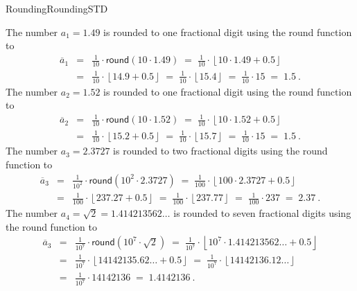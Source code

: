 \begin{MXContent}{Rounding}{Rounding}{STD}
\begin{MExample}
The number $a_{1}=1.49$ is rounded to one fractional digit using the \textsf{round} function to
\begin{eqnarray*}
\overline{a}_1 & = & \frac{1}{10}\cdot \mathsf{round}(10 \cdot 1.49) \; =\; \frac{1}{10}\cdot \left\lfloor{10\cdot 1.49 + 0.5}\right\rfloor\\
&=& \frac{1}{10}\cdot \left\lfloor{14.9+0.5}\right\rfloor \;=\; \frac{1}{10}\cdot \left\lfloor{ 15.4 }\right\rfloor \;=\; \frac{1}{10}\cdot 15 \;=\; 1.5\: .
\end{eqnarray*}
The number $a_{2}=1.52$ is rounded to one fractional digit using the  \textsf{round} function to
\begin{eqnarray*}
\overline{a}_{2}& = & \frac{1}{10}\cdot \mathsf{round}(10 \cdot 1.52)\; =\; \frac{1}{10}\cdot \left\lfloor{ 10\cdot 1.52 + 0.5 }\right\rfloor \\
& = & \frac{1}{10}\cdot \left\lfloor{ 15.2+0.5}\right\rfloor \;=\; \frac{1}{10}\cdot \left\lfloor{ 15.7 }\right\rfloor\; =\; \frac{1}{10}\cdot 15 \;=\; 1.5\: .
\end{eqnarray*}
The number $a_{3}=2.3727$ is rounded to two fractional digits using the  \textsf{round} function to
\begin{eqnarray*}
\overline{a}_{3} & = & \frac{1}{10^{2}}\cdot \mathsf{round}(10^{2}\cdot 2.3727)\; =\; \frac{1}{100}\cdot \left\lfloor{ 100\cdot 2.3727 + 0.5 }\right\rfloor \\
& = & \frac{1}{100}\cdot \left\lfloor{ 237.27+0.5}\right\rfloor\; =\; \frac{1}{100}\cdot \left\lfloor{ 237.77 }\right\rfloor \; =\;  \frac{1}{100}\cdot 237\; =\; 2.37\: .
\end{eqnarray*}
The number  $a_{4}=\sqrt{2}=1.414213562\ldots$ is rounded to seven fractional digits using the  \textsf{round} function to
\begin{eqnarray*}
\overline{a}_{3} & = & \frac{1}{10^{7}}\cdot \mathsf{round}(10^{7}\cdot \sqrt{2})\; =\; \frac{1}{10^{7}}\cdot \left\lfloor{ 10^{7}\cdot 1.414213562\ldots + 0.5 }\right\rfloor \\
& = & \frac{1}{10^{7}}\cdot \left\lfloor{ 14142135.62\ldots+0.5}\right\rfloor \;=\; \frac{1}{10^{7}}\cdot \left\lfloor{ 14142136.12\ldots }\right\rfloor \\
& = & \frac{1}{10^{7}}\cdot 14142136\; =\;  1.4142136\: .
\end{eqnarray*}
\end{MExample}


\end{MXContent}
